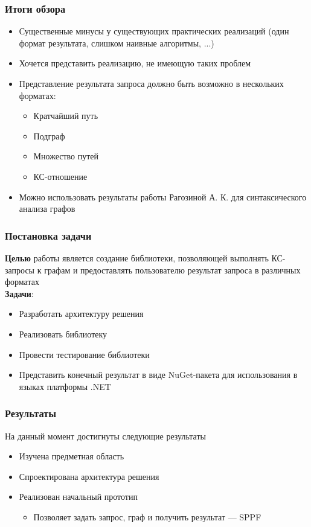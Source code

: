 \documentclass{beamer}
\begin{document}
\begin{frame}
  \transwipe[direction=90]
  \frametitle{Итоги обзора}
  \begin{itemize}
    \item Существенные минусы у существующих практических реализаций (один формат результата, слишком наивные алгоритмы, ...)
    \item Хочется представить реализацию, не имеющую таких проблем
    \item Представление результата запроса должно быть возможно в нескольких форматах:
    \begin{itemize}
        \item Кратчайший путь
        \item Подграф
        \item Множество путей
        \item КС-отношение
    \end{itemize}
    \item Можно использовать результаты работы Рагозиной А. К. для синтаксического анализа графов
  \end{itemize}
\end{frame}

\begin{frame}
  \transwipe[direction=90]
  \frametitle{Постановка задачи}
  \textbf{Целью} работы является создание библиотеки, позволяющей выполнять КС-запросы к графам и предоставлять пользователю результат запроса в различных форматах\\ 
  \textbf{Задачи}:
  \begin{itemize}
    \item Разработать архитектуру решения
    \item Реализовать библиотеку
    \item Провести тестирование библиотеки
    \item Представить конечный результат в виде NuGet-пакета для использования в языках платформы .NET
  \end{itemize}
\end{frame}

\begin{frame}
  \transwipe[direction=90]
  \frametitle{Результаты}
  На данный момент достигнуты следующие результаты
  \begin{itemize}
    \item Изучена предметная область
    \item Спроектирована архитектура решения
    \item Реализован начальный прототип
    \begin{itemize}
        \item Позволяет задать запрос, граф и получить результат --- SPPF
    \end{itemize}
  \end{itemize}
\end{frame}
\end{document}
